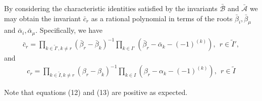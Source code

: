 \documentclass[12pt]{article}
\begin{document}
By considering the characteristic identities satisfied by the invariants $\bar{\mathcal{B}}$ and $\bar{\mathcal{A}}$ we may obtain the invariant $\bar{c}_r$ as a rational polynomial in terms of the roots $\bar{\beta}_i,\bar{\beta}_\mu$ and $\bar{\alpha}_i,\bar{\alpha}_\mu$. Specifically, we have \cite{GIW1}
\begin{align}
\bar{c}_r = \prod_{k\in \tilde{I}',k\neq r} \left(\bar{\beta}_r - \bar{\beta}_k\right)^{-1}\prod_{k\in
I'} \left(\bar{\beta}_r - \bar{\alpha}_k - (-1)^{(k)}\right),\ \ r\in \tilde{I}',
\end{align}
and
\begin{align}
c_r = \prod_{k\in \tilde{I},k\neq r} \left(\beta_r - \beta_k \right)^{-1}\prod_{k\in
I} \left(\beta_r - \alpha_k - (-1)^{(k)}\right),\ \ r\in \tilde{I}
\end{align}

Note that equations (12) and (13) are positive as expected. 
\end{document}

